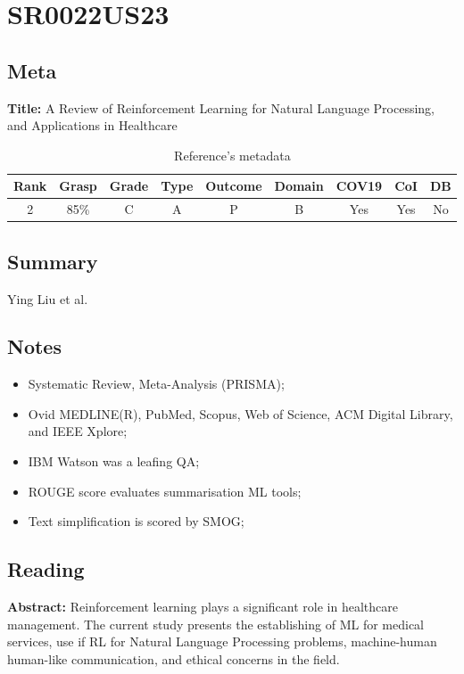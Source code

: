 \section{ SR0022US23 }


\subsection{Meta}

    \textbf{Title:}
    A Review of Reinforcement Learning for Natural Language Processing, and Applications in Healthcare

    \begin{table}[H]
        \centering
        \begin{tabular}{|c|c|c|c|c|c|c|c|c|}
            \hline
                \textbf{Rank} & \textbf{Grasp} & \textbf{Grade} & \textbf{Type} & \textbf{Outcome} & \textbf{Domain} & \textbf{COV19} & \textbf{CoI} & \textbf{DB} \\
            \hline
                2 & 85\% & C & A & P & B & Yes & Yes & No \\
            \hline
        \end{tabular}
        \caption{Reference's metadata}
        \label{tab:SR0022US23}
    \end{table}

\subsection{Summary}
    Ying Liu et al. \cite{x090}

\subsection{Notes}
    \begin{itemize}
        \item Systematic Review, Meta-Analysis (PRISMA);
        \item Ovid MEDLINE(R), PubMed, Scopus, Web of Science, ACM Digital Library, and IEEE Xplore; 
        \item IBM Watson was a leafing QA;
        \item ROUGE score evaluates summarisation ML tools;
        \item Text simplification is scored by SMOG;
    \end{itemize}


\subsection{Reading}
    \textbf{Abstract:}
    Reinforcement learning plays a significant role in healthcare management. The current study presents the establishing of ML for medical services, use if RL for Natural Language Processing problems, machine-human human-like communication, and ethical concerns in the field.
    
